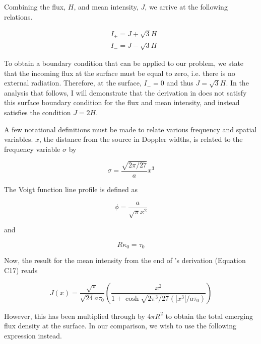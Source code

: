 \documentclass[onecolumn]{aastex63}
\begin{document}
Combining the flux, $H$, and mean intensity, $J$, we arrive at the following relations.

\begin{equation}
    \begin{split}
        &I_+ = J + \sqrt{3}H \\
        &I_- = J - \sqrt{3}H
    \end{split}
\end{equation}

To obtain a boundary condition that can be applied to our problem, we state that the incoming flux at the surface must be equal to zero, i.e. there is no external radiation. Therefore, at the surface, $I_- = 0$ and thus $J=\sqrt{3}H$. In the analysis that follows, I will demonstrate that the derivation in \cite{2006ApJ...649...14D} does not satisfy this surface boundary condition for the flux and mean intensity, and instead satisfies the condition $J = 2H$.

A few notational definitions must be made to relate various frequency and spatial variables. $x$, the distance from the source in Doppler widths, is related to the frequency variable $\sigma$ by 

\begin{equation} \label{sigma}
    \sigma = \frac{\sqrt{2\pi/27}}{a} x^3
\end{equation}

The Voigt function line profile is defined as 

\begin{equation} \label{lineprofile}
    \phi = \frac{a}{\sqrt{\pi} x^2}
\end{equation}

and

\begin{equation} \label{tau}
    R\kappa_0 = \tau_0
\end{equation}

Now, the result for the mean intensity from the end of \cite{2006ApJ...649...14D}'s derivation (Equation C17) reads

\begin{equation} \label{dijkstra}
    J(x) = \frac{\sqrt{\pi}}{\sqrt{24}a\tau_0}\left(\frac{x^2}{1 + \cosh{\sqrt{2\pi^3/27}(|x^3|/a\tau_0)}}\right)
\end{equation}

However, this has been multiplied through by $4\pi R^2$ to obtain the total emerging flux density at the surface. In our comparison, we wish to use the following expression instead.
\end{document}
